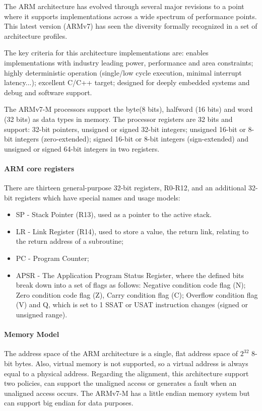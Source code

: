 \par The ARM architecture has evolved through several major revisions to a point where it supports implementations across a wide spectrum of performance points. This latest version (ARMv7) has seen the diversity formally recognized in a set of architecture profiles.
\par The key criteria for this architecture implementations are: enables implementations with industry leading power, performance and area constraints; highly deterministic operation (single/low cycle execution, minimal interrupt latency...); excellent C/C++ target; designed for deeply embedded systems and debug and software support.
\par The ARMv7-M processors support the byte(8 bits), halfword (16 bits) and word (32 bits) as data types in memory. The processor registers are 32 bits and support: 32-bit pointers, unsigned or signed 32-bit integers; unsigned 16-bit or 8-bit integers (zero-extended); signed 16-bit or 8-bit integers (sign-extended) and unsigned or signed 64-bit integers in two registers.
\paragraph{ARM core registers} There are thirteen general-purpose 32-bit registers, R0-R12, and an additional 32-bit registers which have special names and usage models:
\begin{itemize}
	\item SP - Stack Pointer (R13), used as a pointer to the active stack.
	\item LR - Link Register (R14), used to store a value, the return link, relating to the return address of a subroutine;
	\item PC - Program Counter;
	\item APSR - The Application Program Status Register, where the defined bits break down into a set of flags as follows: Negative condition code flag (N); Zero condition code flag (Z), Carry condition flag (C); Overflow condition flag (V) and Q, which is set to 1 SSAT or USAT instruction changes (signed or unsigned range).
\end{itemize}
\paragraph{Memory Model} The address space of the ARM architecture is a single, flat address space of \begin{math} 2^{32} \end{math} 8-bit bytes. Also, virtual memory is not supported, so a virtual address is always equal to a physical address. Regarding the alignment, this architecture support two policies, can support the unaligned access or generates a fault when an unaligned access occurs. The ARMv7-M has a little endian memory system but can support big endian for data purposes.

